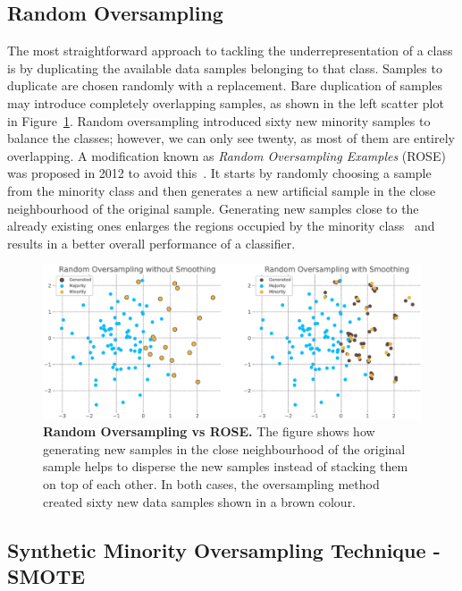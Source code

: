 \subsection{Random Oversampling}
\label{subsection:random-oversampling}

The most straightforward approach to tackling the underrepresentation of a class is by duplicating
the available data samples belonging to that class. Samples to duplicate are chosen randomly with a
replacement. Bare duplication of samples may introduce completely overlapping samples, as shown in
the left scatter plot in Figure~\ref{figure:random-oversampling}. Random oversampling introduced
sixty new minority samples to balance the classes; however, we can only see twenty, as most of them
are entirely overlapping. A modification known as \emph{Random Oversampling Examples} (ROSE) was
proposed in 2012 to avoid this~\cite{rose}. It starts by randomly choosing a sample from the
minority class and then generates a new artificial sample in the close neighbourhood of the
original sample. Generating new samples close to the already existing ones enlarges the regions
occupied by the minority class~\cite{smote} and results in a better overall performance of a
classifier.

\begin{figure}
    \centering
    \includegraphics[width=\linewidth]{figures/random_oversampling_vs_rose.eps}
    \caption{
        \textbf{Random Oversampling vs ROSE.} The figure shows how generating new samples in the
        close neighbourhood of the original sample helps to disperse the new samples instead of
        stacking them on top of each other. In both cases, the oversampling method created sixty
        new data samples shown in a brown colour.
    }
    \label{figure:random-oversampling}
\end{figure}


\subsection{Synthetic Minority Oversampling Technique - SMOTE}
\label{subsection:smote}

